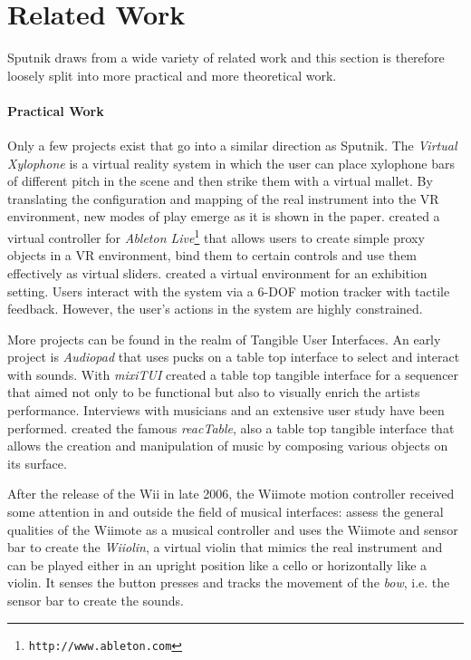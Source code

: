 \documentclass[10pt,a4paper]{scrartcl}
\begin{document}
\section{Related Work}
Sputnik draws from a wide variety of related work and this section is therefore loosely split into more practical and more theoretical work. 

\paragraph{Practical Work}
Only a few projects exist that go into a similar direction as Sputnik. The \emph{Virtual Xylophone}\cite{Maki-Patola2005} is a virtual reality system in which the user can place xylophone bars of different pitch in the scene and then strike them with a virtual mallet. By translating the configuration and mapping of the real instrument into the VR environment, new modes of play emerge as it is shown in the paper. \cite{Zappi2010} created a virtual controller for \emph{Ableton Live}\footnote{\texttt{http://www.ableton.com}} that allows users to create simple proxy objects in a VR environment, bind them to certain controls and use them effectively as virtual sliders. \cite{Rodet2005} created a virtual environment for an exhibition setting. Users interact with the system via a 6-DOF motion tracker with tactile feedback. However, the user's actions in the system are highly constrained.

More projects can be found in the realm of Tangible User Interfaces. An early project is \emph{Audiopad}\cite{Patten2002} that uses pucks on a table top interface to select and interact with sounds. With \emph{mixiTUI} \cite{Pedersen2009} created a table top tangible interface for a sequencer that aimed not only to be functional but also to visually enrich the artists performance. Interviews with musicians and an extensive user study have been performed. \cite{Jorda2007} created the famous \emph{reacTable}, also a table top tangible interface that allows the creation and manipulation of music by composing various objects on its surface.

After the release of the Wii in late 2006, the Wiimote motion controller received some attention in and outside the field of musical interfaces: 
\cite{Kiefer2008} assess the general qualities of the Wiimote as a musical controller and \cite{Miller2010} uses the Wiimote and sensor bar to create the \emph{Wiiolin}, a virtual violin that mimics the real instrument and can be played either in an upright position like a cello or horizontally like a violin. It senses the button presses and tracks the movement of the \emph{bow}, i.e. the sensor bar to create the sounds.
\end{document}
